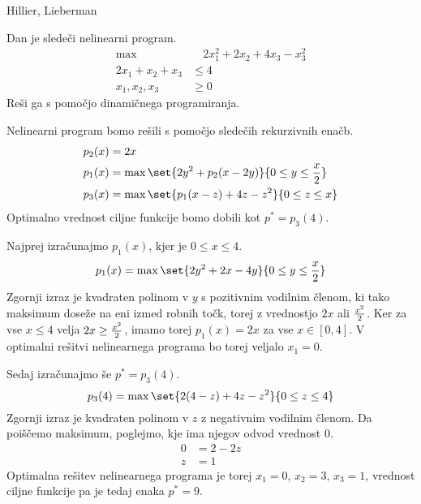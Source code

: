 \begin{naloga}{Hillier, Lieberman}{\cite[Problem~11.3-16]{hl}}
\begin{vprasanje}
Dan je sledeči nelinearni program.
\begin{align*}
\max &\quad 2x_1^2 + 2x_2 + 4x_3 - x_3^2 \\[1ex]
2x_1 + x_2 + x_3 &\le 4 \\
x_1, x_2, x_3 &\ge 0
\end{align*}
Reši ga s pomočjo dinamičnega programiranja.
\end{vprasanje}

\begin{odgovor}
Nelinearni program bomo rešili s pomočjo sledečih rekurzivnih enačb.
\begin{align*}
p_2(x) &= 2x \\
p_1(x) &= \max\set{2y^2 + p_2(x-2y)}{0 \le y \le {x \over 2}} \\
p_3(x) &= \max\set{p_1(x-z) + 4z - z^2}{0 \le z \le x}
\end{align*}
Optimalno vrednost ciljne funkcije bomo dobili kot $p^* = p_3(4)$.

Najprej izračunajmo $p_1(x)$, kjer je $0 \le x \le 4$.
$$
p_1(x) = \max\set{2y^2 + 2x - 4y}{0 \le y \le {x \over 2}}
$$
Zgornji izraz je kvadraten polinom v $y$ s pozitivnim vodilnim členom,
ki tako maksimum doseže na eni izmed robnih točk,
torej z vrednostjo $2x$ ali ${x^2 \over 2}$.
Ker za vse $x \le 4$ velja $2x \ge {x^2 \over 2}$,
imamo torej $p_1(x) = 2x$ za vse $x \in [0, 4]$.
V optimalni rešitvi nelinearnega programa bo torej veljalo $x_1 = 0$.

Sedaj izračunajmo še $p^* = p_3(4)$.
$$
p_3(4) = \max\set{2(4-z) + 4z - z^2}{0 \le z \le 4}
$$
Zgornji izraz je kvadraten polinom v $z$ z negativnim vodilnim členom.
Da po\-išče\-mo maksimum, poglejmo, kje ima njegov odvod vrednost $0$.
\begin{align*}
0 &= 2 - 2z \\
z &= 1
\end{align*}
Optimalna rešitev nelinearnega programa
je torej $x_1 = 0$, $x_2 = 3$, $x_3 = 1$,
vrednost ciljne funkcije pa je tedaj enaka $p^* = 9$.
\end{odgovor}
\end{naloga}
